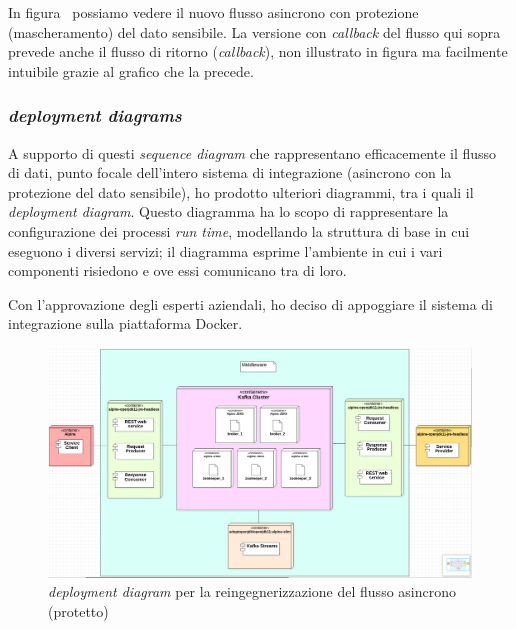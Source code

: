 In figura \thefigure\ possiamo vedere il nuovo flusso asincrono con protezione (mascheramento) del dato sensibile.
La versione con \textit{callback} del flusso qui sopra prevede anche il flusso di ritorno (\textit{callback}), non illustrato in figura ma facilmente intuibile grazie al grafico che la precede.

\subsubsection{ \textit{deployment diagrams}}

A supporto di questi  \textit{sequence diagram} che rappresentano efficacemente il flusso di dati, punto focale dell'intero sistema di integrazione (asincrono con la protezione del dato sensibile), ho prodotto ulteriori diagrammi, tra i quali il \textit{deployment diagram}.
Questo diagramma ha lo scopo di rappresentare la configurazione dei processi \textit{run time}, modellando la struttura di base in cui eseguono i diversi servizi;
il diagramma esprime l'ambiente in cui i vari componenti risiedono e ove essi comunicano tra di loro.

Con l'approvazione degli esperti aziendali, ho deciso di appoggiare il sistema di integrazione sulla piattaforma Docker.

\begin{figure}[h]
  \begin{center}
    \includegraphics[width=\textwidth,  trim={0 0.2cm 0.2cm 0},clip]{images/ap_deployment.png}
    \caption{ \textit{deployment diagram} per la reingegnerizzazione del flusso asincrono (protetto)}
  \end{center}
\end{figure}

